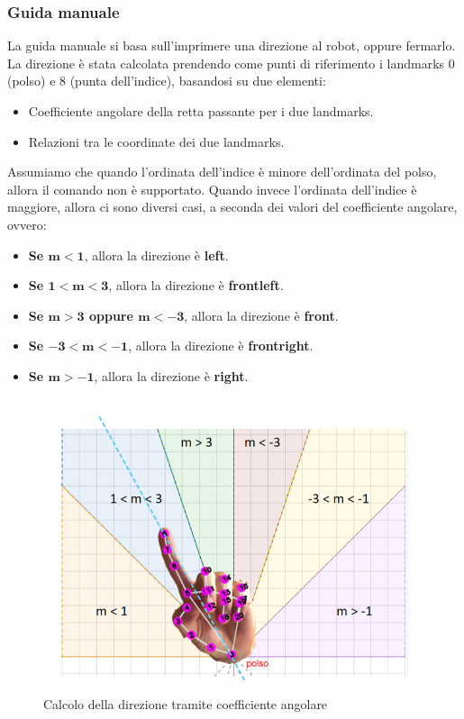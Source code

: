 \documentclass[]{article}
\begin{document}
\subsubsection{Guida manuale}
La guida manuale si basa sull'imprimere una direzione al robot, oppure fermarlo. La direzione è stata calcolata prendendo come punti di riferimento i landmarks 0 (polso) e 8 (punta dell'indice), basandosi su due elementi:
\begin{itemize}
    \item Coefficiente angolare della retta passante per i due landmarks.
    \item Relazioni tra le coordinate dei due landmarks.
\end{itemize}
Assumiamo che quando l'ordinata dell'indice è minore dell'ordinata del polso, allora il comando non è supportato. Quando invece l'ordinata dell'indice è maggiore, allora ci sono diversi casi, a seconda dei valori del coefficiente angolare, ovvero:
\begin{itemize}
    \item \textbf{Se $\mathbf{m < 1}$}, allora la direzione è \textbf{left}.
    \item \textbf{Se $\mathbf{1 < m < 3}$}, allora la direzione è \textbf{frontleft}.
    \item \textbf{Se $\mathbf{m > 3}$ oppure $\mathbf{m < -3}$}, allora la direzione è \textbf{front}.
    \item \textbf{Se $\mathbf{-3 < m < -1}$}, allora la direzione è \textbf{frontright}.
    \item \textbf{Se $\mathbf{m > -1}$}, allora la direzione è \textbf{right}.
\end{itemize}

\begin{figure}[H]
    \centering
    \includegraphics[height=0.5\linewidth]{immagini/calcolo_con_coeff_angolare_con_mano.png}
    \caption{Calcolo della direzione tramite coefficiente angolare}
\end{figure}
\end{document}
